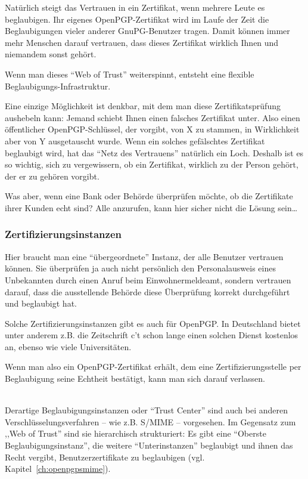 \documentclass[a4paper,11pt, oneside,openright,titlepage,dvips]{scrbook}
\newcommand\margin[1]{\marginline {\sffamily\scriptsize #1}}
\newcommand{\IncludeImage}[2][]{\texorhtml{%
\texttt{[image: \#2]}%
}{%
\htmlimg{#2.png}%
}}
\newcounter{chapter}
\newcounter{section}[chapter]
\begin{document}
Natürlich steigt das Vertrauen in ein Zertifikat,
wenn mehrere Leute es beglaubigen. Ihr eigenes OpenPGP-Zertifikat
wird im Laufe der Zeit die Beglaubigungen vieler anderer GnuPG-Benutzer
tragen. Damit können immer mehr Menschen darauf vertrauen, dass dieses
Zertifikat wirklich Ihnen und niemandem sonst gehört.

Wenn man dieses "`Web of Trust"' weiterspinnt, entsteht eine flexible
Beglaubigungs-Infra\-struktur.

Eine einzige Möglichkeit ist denkbar, mit dem man diese Zertifikatsprüfung 
aushebeln kann: Jemand schiebt Ihnen einen falsches
Zertifikat unter. Also einen öffentlicher OpenPGP-Schlüssel, der vorgibt, von X
zu stammen, in Wirklichkeit aber von Y ausgetauscht wurde.  Wenn ein
solches gefälschtes Zertifikat beglaubigt wird, hat das "`Netz des
Vertrauens"' natürlich ein Loch. Deshalb ist es so wichtig, sich zu
vergewissern, ob ein Zertifikat, wirklich zu der Person
gehört, der er zu gehören vorgibt.

Was aber, wenn eine Bank oder Behörde überprüfen möchte, ob die
Zertifikate ihrer Kunden echt sind? Alle anzurufen, kann hier sicher
nicht die Lösung sein\ldots


\clearpage
\subsubsection{Zertifizierungsinstanzen}

Hier braucht man eine "`übergeordnete"' Instanz, der alle Benutzer
vertrauen können.  Sie überprüfen ja auch nicht persönlich den
Personalausweis eines Unbekannten durch einen Anruf beim Ein\-wohner\-melde\-amt,
sondern vertrauen darauf, dass die ausstellende
Behörde diese Überprüfung korrekt durchgeführt und beglaubigt hat.

Solche Zertifizierungsinstanzen gibt es auch für OpenPGP.
In Deutschland bietet unter anderem z.B. die
Zeitschrift c't schon lange einen solchen Dienst kostenlos an, ebenso
wie viele Universitäten.
\T\margin{\IncludeImage[width=1.5cm]{openpgp-icon}}

Wenn man also ein OpenPGP-Zertifikat erhält, dem eine
Zertifizierungsstelle per Beglaubigung seine Echtheit bestätigt, kann man
sich darauf verlassen.

~\\
Derartige Beglaubigungsinstanzen oder "`Trust Center"' sind auch bei
anderen Verschlüsselungsverfahren -- wie z.B. S/MIME  --
\T\margin{\IncludeImage[width=1.5cm]{smime-icon}}
vorgesehen.
Im Gegensatz zum ,,Web of Trust'' sind sie hierarchisch strukturiert: Es gibt eine "`Oberste
Beglaubigungsinstanz"', die weitere "`Unterinstanzen"' beglaubigt und
ihnen das Recht vergibt, Benutzerzertifikate zu beglaubigen
(vgl. Kapitel~\ref{ch:openpgpsmime}).
\end{document}

